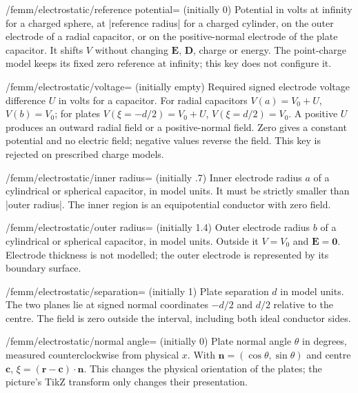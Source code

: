 \begin{key}{/femm/electrostatic/reference potential= (initially 0)}
Potential in volts at infinity for a charged sphere, at |reference radius| for
a charged cylinder, on the outer electrode of a radial capacitor, or on the
positive-normal electrode of the plate capacitor. It shifts $V$ without
changing $\mathbf E$, $\mathbf D$, charge or energy. The point-charge model
keeps its fixed zero reference at infinity; this key does not configure it.
\end{key}
\begin{key}{/femm/electrostatic/voltage= (initially \normalfont empty)}
Required signed electrode voltage difference $U$ in volts for a capacitor.
For radial capacitors $V(a)=V_0+U$, $V(b)=V_0$; for plates
$V(\xi=-d/2)=V_0+U$, $V(\xi=d/2)=V_0$. A positive $U$ produces an outward
radial field or a positive-normal field. Zero gives a constant potential and
no electric field; negative values reverse the field. This key is rejected on
prescribed charge models.
\end{key}
\begin{key}{/femm/electrostatic/inner radius= (initially .7)}
Inner electrode radius $a$ of a cylindrical or spherical capacitor, in model
units. It must be strictly smaller than |outer radius|. The inner region is
an equipotential conductor with zero field.
\end{key}
\begin{key}{/femm/electrostatic/outer radius= (initially 1.4)}
Outer electrode radius $b$ of a cylindrical or spherical capacitor, in model
units. Outside it $V=V_0$ and $\mathbf E=\mathbf 0$. Electrode thickness is not
modelled; the outer electrode is represented by its boundary surface.
\end{key}
\begin{key}{/femm/electrostatic/separation= (initially 1)}
Plate separation $d$ in model units. The two planes lie at signed normal
coordinates $-d/2$ and $d/2$ relative to the centre. The field is zero outside
the interval, including both ideal conductor sides.
\end{key}
\begin{key}{/femm/electrostatic/normal angle= (initially 0)}
Plate normal angle $\theta$ in degrees, measured counterclockwise from physical
$x$. With $\mathbf n=(\cos\theta,\sin\theta)$ and centre $\mathbf c$,
$\xi=(\mathbf r-\mathbf c)\cdot\mathbf n$. This changes the physical orientation
of the plates; the picture's TikZ transform only changes their presentation.
\end{key}
